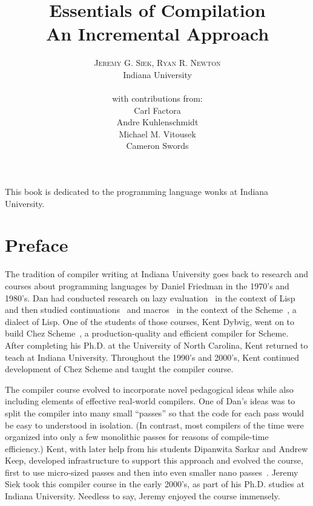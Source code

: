 \documentclass[11pt]{book}
\title{\Huge \textbf{Essentials of Compilation} \\
  \huge An Incremental Approach}
\author{\textsc{Jeremy G. Siek, Ryan R. Newton} \\
  Indiana University \\
  \\
  with contributions from: \\
  Carl Factora \\
  Andre Kuhlenschmidt \\
  Michael M. Vitousek \\
  Cameron Swords
   }
\newenvironment{dedication}
{
   \cleardoublepage
   \thispagestyle{empty}
   \vspace*{\stretch{1}}
   \hfill\begin{minipage}[t]{0.66\textwidth}
   \raggedright
}
{
   \end{minipage}
   \vspace*{\stretch{3}}
   \clearpage
}
\begin{document}
\frontmatter
\maketitle

\begin{dedication}
This book is dedicated to the programming language wonks at Indiana
University.
\end{dedication}

\tableofcontents
\listoffigures

\mainmatter

\chapter*{Preface}

The tradition of compiler writing at Indiana University goes back to
research and courses about programming languages by Daniel Friedman in
the 1970's and 1980's. Dan had conducted research on lazy
evaluation~\citep{Friedman:1976aa} in the context of
Lisp~\citep{McCarthy:1960dz} and then studied
continuations~\citep{Felleisen:kx} and
macros~\citep{Kohlbecker:1986dk} in the context of the
Scheme~\citep{Sussman:1975ab}, a dialect of Lisp.  One of the students
of those courses, Kent Dybvig, went on to build Chez
Scheme~\citep{Dybvig:2006aa}, a production-quality and efficient
compiler for Scheme. After completing his Ph.D. at the University of
North Carolina, Kent returned to teach at Indiana University.
Throughout the 1990's and 2000's, Kent continued development of Chez
Scheme and taught the compiler course.

The compiler course evolved to incorporate novel pedagogical ideas
while also including elements of effective real-world compilers.  One
of Dan's ideas was to split the compiler into many small ``passes'' so
that the code for each pass would be easy to understood in isolation.
(In contrast, most compilers of the time were organized into only a
few monolithic passes for reasons of compile-time efficiency.)  Kent,
with later help from his students Dipanwita Sarkar and Andrew Keep,
developed infrastructure to support this approach and evolved the
course, first to use micro-sized passes and then into even smaller
nano passes~\citep{Sarkar:2004fk,Keep:2012aa}. Jeremy Siek took this
compiler course in the early 2000's, as part of his Ph.D. studies at
Indiana University. Needless to say, Jeremy enjoyed the course
immensely.
\end{document}
